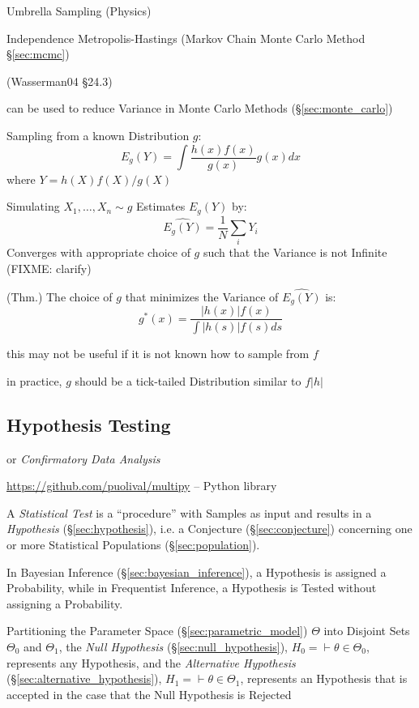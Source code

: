 Umbrella Sampling (Physics)

\fist Independence Metropolis-Hastings (Markov Chain Monte Carlo Method
\S\ref{sec:mcmc})

(Wasserman04 \S24.3)

can be used to reduce Variance in Monte Carlo Methods (\S\ref{sec:monte_carlo})

Sampling from a known Distribution $g$:
\[
  E_g(Y) = \int \frac{h(x)f(x)}{g(x)} g(x) dx
\]
where $Y = h(X)f(X)/g(X)$

Simulating $X_1, \ldots, X_n \sim g$ Estimates $E_g(Y)$ by:
\[
  \hat{E_g(Y)} = \frac{1}{N}\sum_i Y_i
\]
Converges with appropriate choice of $g$ such that the Variance is not Infinite
(FIXME: clarify)

(Thm.) The choice of $g$ that minimizes the Variance of $\hat{E_g(Y)}$ is:
\[
  g^*(x) = \frac{|h(x)| f(x)}{\int|h(s)| f(s) ds}
\]

this may not be useful if it is not known how to sample from $f$

in practice, $g$ should be a tick-tailed Distribution similar to $f|h|$



\subsection{Hypothesis Testing}\label{sec:hypothesis_testing}

or \emph{Confirmatory Data Analysis}

\url{https://github.com/puolival/multipy} -- Python library

A \emph{Statistical Test} is a ``procedure'' with Samples as input and results
in a \emph{Hypothesis} (\S\ref{sec:hypothesis}), i.e. a Conjecture
(\S\ref{sec:conjecture}) concerning one or more Statistical Populations
(\S\ref{sec:population}).

\fist In Bayesian Inference (\S\ref{sec:bayesian_inference}), a Hypothesis is
assigned a Probability, while in Frequentist Inference, a Hypothesis is Tested
without assigning a Probability.

Partitioning the Parameter Space (\S\ref{sec:parametric_model}) $\Theta$ into
Disjoint Sets $\Theta_0$ and $\Theta_1$, the \emph{Null Hypothesis}
(\S\ref{sec:null_hypothesis}), $H_0 = \vdash \theta \in \Theta_0$, represents
any Hypothesis, and the \emph{Alternative Hypothesis}
(\S\ref{sec:alternative_hypothesis}), $H_1 = \vdash \theta \in \Theta_1$,
represents an Hypothesis that is accepted in the case that the Null Hypothesis
is Rejected

